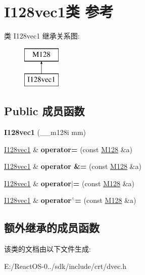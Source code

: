 \hypertarget{class_i128vec1}{}\section{I128vec1类 参考}
\label{class_i128vec1}
类 I128vec1 继承关系图\+:\begin{figure}[H]
\begin{center}
\leavevmode
\includegraphics[height=2.000000cm]{class_i128vec1}
\end{center}
\end{figure}
\subsection*{Public 成员函数}
\begin{DoxyCompactItemize}
\item 
\mbox{\label{class_i128vec1_a7234eb38cf47cf54a6eeb2ebbacaea14}} 
{\bfseries I128vec1} (\+\_\+\+\_\+m128i mm)
\item 
\mbox{\label{class_i128vec1_ab73697331e3fc2a6908e99363f45a1f3}} 
\hyperlink{class_i128vec1}{I128vec1} \& {\bfseries operator=} (const \hyperlink{class_m128}{M128} \&a)
\item 
\mbox{\label{class_i128vec1_a87e6a9fdde56a74e39939cd5fa4d4c4b}} 
\hyperlink{class_i128vec1}{I128vec1} \& {\bfseries operator \&=} (const \hyperlink{class_m128}{M128} \&a)
\item 
\mbox{\label{class_i128vec1_a21862f6c5ea9aa54b3ae81f884b1df09}} 
\hyperlink{class_i128vec1}{I128vec1} \& {\bfseries operator$\vert$=} (const \hyperlink{class_m128}{M128} \&a)
\item 
\mbox{\label{class_i128vec1_a3d4a064b56fb4edbfab667a64cd4900a}} 
\hyperlink{class_i128vec1}{I128vec1} \& {\bfseries operator$^\wedge$=} (const \hyperlink{class_m128}{M128} \&a)
\end{DoxyCompactItemize}
\subsection*{额外继承的成员函数}


该类的文档由以下文件生成\+:\begin{DoxyCompactItemize}
\item 
E\+:/\+React\+O\+S-\/0../sdk/include/crt/dvec.\+h\end{DoxyCompactItemize}

